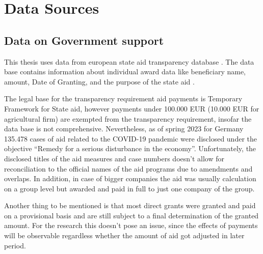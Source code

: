 
\chapter{Data Sources} %

\label{Chapter3} %


\section{Data on Government support}

This thesis uses data from european state aid transparency database \parencite{eu_com_state_2023}. 
The data base contains information about individual award data like beneficiary name, amount, Date of Granting, and the purpose of the state aid \parencite{eu_com_state_2023}. 

The legal base for the transparency requirement aid payments is Temporary Framework for State aid, however payments under 100.000 EUR (10.000 EUR for agricultural firm) are exempted from the transparency requirement, insofar the data base is not comprehensive. Nevertheless, as of spring 2023 for Germany 135.478 cases of aid related to the COVID-19 pandemic were disclosed under the objective “Remedy for a serious disturbance in the economy”. Unfortunately, the disclosed titles of the aid measures and case numbers doesn't allow for reconciliation to the official names of the aid programs due to amendments and overlaps. In addition, in case of bigger companies the aid was usually calculation on a group level but awarded and paid in full to just one company of the group. 

Another thing to be mentioned is that most direct grants were granted and paid on a provisional basis and are still subject to a final determination of the granted amount. For the research this doesn't pose an issue, since the effects of payments will be observable regardless whether the amount of aid got adjusted in later period. 






